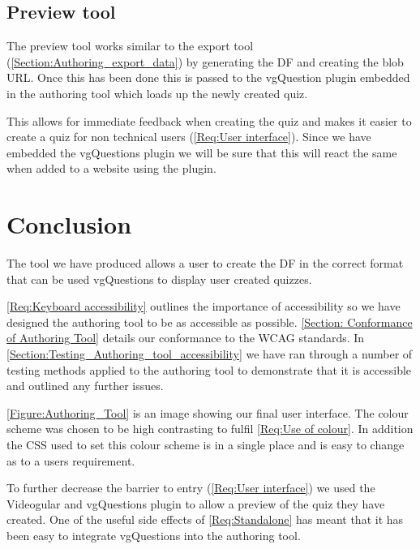\subsection{Preview tool}

The preview tool works similar to the export tool (\autoref{Section:Authoring_export_data}) by generating the \gls{DF} and creating the blob URL. Once this has been done this is passed to the vgQuestion plugin embedded in the authoring tool which loads up the newly created quiz.

This allows for immediate feedback when creating the quiz and makes it easier to create a quiz for non technical users (\cref{Req:User interface}). Since we have embedded the vgQuestions plugin we will be sure that this will react the same when added to a website using the plugin.

\section{Conclusion}
\label{Section:Authoring_Conclusion}

The tool we have produced allows a user to create the \gls{DF} in the correct format that can be used vgQuestions to display user created quizzes.

\cref{Req:Keyboard accessibility} outlines the importance of accessibility so we have designed the authoring tool to be as accessible as possible. \autoref{Section: Conformance of Authoring Tool} details our conformance to the \gls{WCAG} standards. In \autoref{Section:Testing_Authoring_tool_accessibility} we have ran through a number of testing methods applied to the authoring tool to demonstrate that it is accessible and outlined any further issues.

\autoref{Figure:Authoring_Tool} is an image showing our final user interface. The colour scheme was chosen to be high contrasting to fulfil \cref{Req:Use of colour}. In addition the CSS used to set this colour scheme is in a single place and is easy to change as to a users requirement.

To further decrease the barrier to entry (\cref{Req:User interface}) we used the \gls{Videogular} and \gls{vgQuestions} plugin to allow a preview of the quiz they have created. One of the useful side effects of \cref{Req:Standalone} has meant that it has been easy to integrate \gls{vgQuestions} into the authoring tool.

